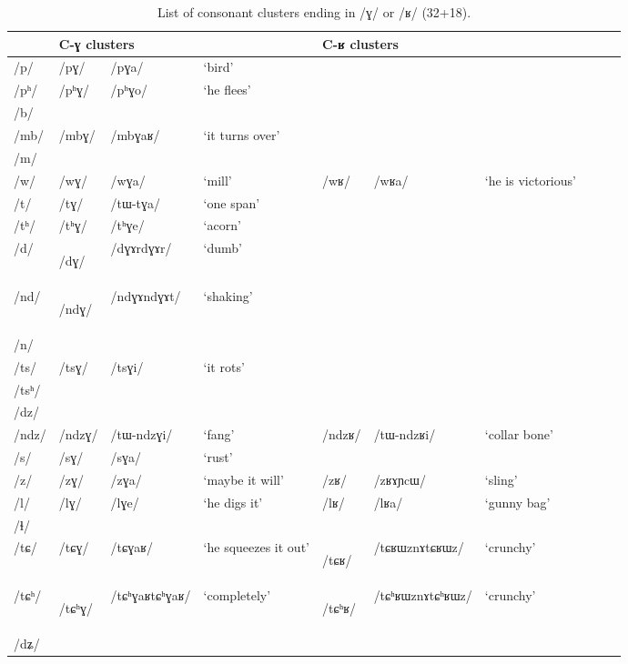 \documentclass[12pt]{article}
\newcommand{\ipa}[1]{\mbox{\phon/#1/}}
\newcommand{\ipab}[1]{{\phon#1}}
\newcommand{\deux}[1]{\ipa{#1}\addtocounter{2clusters}{1}}
\newcommand{\idph}[1]{\cellcolor{gray}\textbf{#1}}
\begin{document}
      
  \begin{landscape}
 \begin{longtable}{llllllllll}
 \caption{List of consonant clusters ending in \ipa{ɣ} or \ipa{ʁ} (32+18).} \label{med.G.R}  \\
\toprule     
 & \multicolumn{3}{l}{C-\ipab{ɣ} clusters} & \multicolumn{3}{l}{C-\ipab{ʁ} clusters}   \\
\midrule
\ipa{p} & \deux{pɣ} & \ipa{pɣa} & `bird' & & & \\ 
\ipa{pʰ} & \deux{pʰɣ} & \ipa{pʰɣo} & `he flees' & & & \\ 
\ipa{b} & & & & & & \\ 
\ipa{mb} & \deux{mbɣ} & \ipa{mbɣaʁ} & `it turns over' & & & \\ 
\ipa{m} & & & & & & \\ 
\ipa{w} & \deux{wɣ} & \ipa{wɣa} & `mill' & \deux{wʁ} & \ipa{wʁa} & `he is victorious' \\ 
\ipa{t} & \deux{tɣ} & \ipa{tɯ-tɣa} & `one span' & & & \\ 
\ipa{tʰ} & \deux{tʰɣ} & \ipa{tʰɣe} & `acorn' & & & \\ 
\ipa{d} & \deux{dɣ}  \idph{} & \ipa{dɣɤrdɣɤr} & `dumb' & & & \\ 
\ipa{nd} & \deux{ndɣ}  \idph{} & \ipa{ndɣɤndɣɤt} & `shaking' & & & \\ 
\ipa{n} & & & & & & \\ 
\ipa{ts} & \deux{tsɣ} & \ipa{tsɣi} & `it rots' & & & & \\
\ipa{tsʰ} & & & & & & \\ 
\ipa{dz} & & & & & & \\ 
\ipa{ndz} & \deux{ndzɣ} & \ipa{tɯ-ndzɣi} & `fang' &\deux{ndzʁ} & \ipa{tɯ-ndzʁi} & `collar bone' & \\
\ipa{s} & \deux{sɣ} & \ipa{sɣa} & `rust' & & & \\ 
\ipa{z} & \deux{zɣ} & \ipa{zɣa} & `maybe it will' & \deux{zʁ} & \ipa{zʁɤɲcɯ} & `sling' \\ 
\ipa{l} & \deux{lɣ} & \ipa{lɣe} & `he digs it' &\deux{lʁ} &\ipa{lʁa} & `gunny bag' \\ 
\ipa{ɬ} & & & & & & \\ 
\ipa{tɕ} & \deux{tɕɣ} & \ipa{tɕɣaʁ} & `he squeezes it out' &\deux{tɕʁ}  \idph{} & \ipa{tɕʁɯznɤtɕʁɯz} & `crunchy' & \\
\ipa{tɕʰ} & \deux{tɕʰɣ} \idph{} & \ipa{tɕʰɣaʁtɕʰɣaʁ} & `completely' &\deux{tɕʰʁ}  \idph{} & \ipa{tɕʰʁɯznɤtɕʰʁɯz} & `crunchy' & \\
\ipa{dʑ} & & & & & & \\ 

\end{longtable}
\end{landscape}
\end{document}
